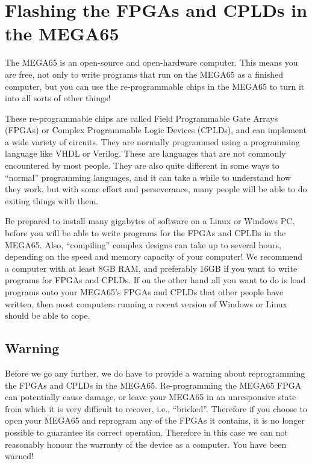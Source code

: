 \chapter{Flashing the FPGAs and CPLDs in the MEGA65}

The MEGA65 is an open-source and open-hardware computer. This means you are free,
not only to write programs that run on the MEGA65 as a finished computer, but you can
use the re-programmable chips in the MEGA65 to turn it into all sorts of other things!

These re-programmable chips are called Field Programmable Gate Arrays (FPGAs) or
Complex Programmable Logic Devices (CPLDs), and can implement a wide variety of circuits.
They are normally programmed using a programming language like VHDL or Verilog.  These
are languages that are not commonly encountered by most people.  They are also quite
different in some ways to ``normal'' programming languages, and it can take a while to
understand how they work, but with some effort and perseverance, many people will be
able to do exiting things with them.

Be prepared to install many gigabytes of software on a Linux or Windows PC, before you will
be able to write programs for the FPGAs and CPLDs in the MEGA65.  Also, ``compiling'' complex
designs can take up to several hours, depending on the speed and memory capacity of your computer!
We recommend a computer with at least 8GB RAM, and preferably 16GB if you want to write
programs for FPGAs and CPLDs. If on the other hand all you want to do is load programs onto
your MEGA65's FPGAs and CPLDs that other people have written, then most computers running a recent
version of Windows or Linux should be able to cope.

\section{Warning}

Before we go any further, we do have to provide a warning about reprogramming the FPGAs and
CPLDs in the MEGA65.
Re-programming the MEGA65 FPGA can potentially cause
damage, or leave your MEGA65 in an unresponsive state from which it is very difficult to
recover, i.e., ``bricked''.  Therefore if you choose to open your MEGA65 and reprogram
any of the FPGAs it contains, it is no longer possible to guarantee its correct operation.
Therefore in this case we can not reasonably honour the warranty of the device as a computer.
You have been warned!

